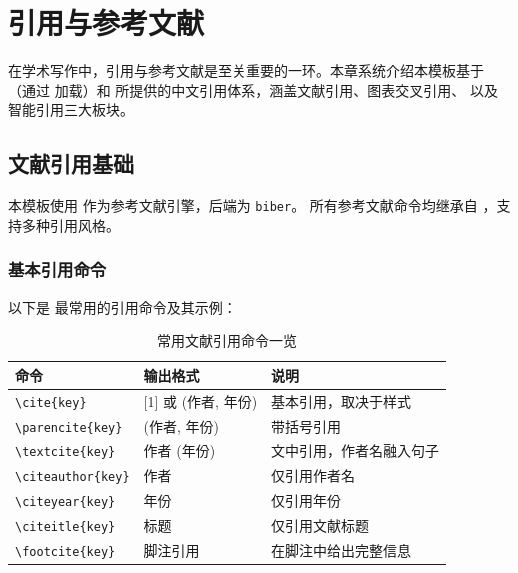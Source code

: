 
\setchapterpreamble[u]{\margintoc}
\chapter{引用与参考文献}

在学术写作中，引用与参考文献是至关重要的一环。本章系统介绍本模板基于
（通过  加载）和
 所提供的中文引用体系，涵盖文献引用、图表交叉引用、
以及  智能引用三大板块。


\section{文献引用基础}

本模板使用  作为参考文献引擎，后端为 \texttt{biber}。
所有参考文献命令均继承自 ，支持多种引用风格。

\subsection{基本引用命令}


以下是  最常用的引用命令及其示例：

\begin{table}[h]
\caption{常用文献引用命令一览}
\begin{tabular}{@{}llp{6cm}@{}}
\toprule
命令 & 输出格式 & 说明 \\
\midrule
\lstinline|\cite{key}| & [1] 或 (作者, 年份) & 基本引用，取决于样式 \\
\lstinline|\parencite{key}| & (作者, 年份) & 带括号引用 \\
\lstinline|\textcite{key}| & 作者 (年份) & 文中引用，作者名融入句子 \\
\lstinline|\citeauthor{key}| & 作者 & 仅引用作者名 \\
\lstinline|\citeyear{key}| & 年份 & 仅引用年份 \\
\lstinline|\citeitle{key}| & 标题 & 仅引用文献标题 \\
\lstinline|\footcite{key}| & 脚注引用 & 在脚注中给出完整信息 \\
\bottomrule
\end{tabular}
\end{table}

